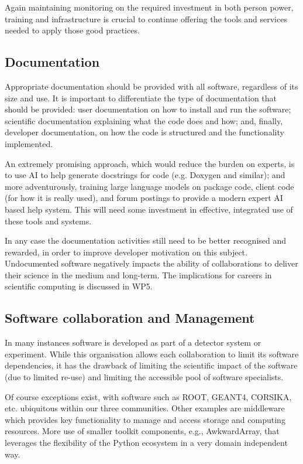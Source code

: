 Again maintaining monitoring on the required  investment in both person power, training and infrastructure is crucial to continue offering the tools and services needed to apply those good practices.


\subsection{Documentation}

Appropriate documentation should be provided with all software, regardless of its size and use. It is important to differentiate the type of documentation that should be provided: user documentation on how to install and run the software; scientific documentation explaining what the code does and how; and, finally, developer documentation, on how the code is structured and the functionality implemented.

An extremely promising approach, which would reduce the burden on experts, is to use AI to help generate docstrings for code (e.g. Doxygen and similar); and more adventurously, training large language models on package code, client code (for how it is really used), and forum postings to provide a modern expert AI based help system. This will need some investment in effective, integrated use of these tools and systems.

In any case the documentation activities still need to be better recognised and rewarded, in order to improve developer motivation on this subject.  Undocumented software negatively impacts the ability of collaborations to deliver their science in the medium and long-term.  The implications for careers in scientific computing is discussed in WP5.


\subsection{Software collaboration and Management}


In many instances software is developed as part of a detector system or experiment. While this organisation allows each collaboration to limit its software dependencies, it has the drawback of limiting the scientific impact of the software (due to limited re-use) and limiting the accessible pool of software specialists.

Of course exceptions exist, with software such as ROOT, GEANT4, CORSIKA, etc. ubiquitous within our three communities. Other examples are middleware which provides key functionality to manage and access storage and computing resources. More use of smaller toolkit components, e.g., AwkwardArray, that leverages the flexibility of the Python ecosystem in a very domain independent way.

